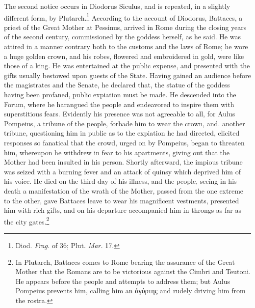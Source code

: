 \documentclass[a4paper, 11pt, oneside, polutonikogreek, english]{article}
\begin{document}
The second notice occurs in Diodorus Siculus, and is repeated, in a slightly different form, by Plutarch.\footnote{Diod. \emph{Frag.} of 36; Plut. \emph{Mar.} 17.} According to the account of Diodorus, Battaces, a priest of the Great Mother at Pessinus, arrived in Rome during the closing years of the second century, commissioned by the goddess herself, as he said. He was attired in a manner contrary both to the customs and the laws of Rome; he wore a huge golden crown, and his robes, flowered and embroidered in gold, were like those of a king. He was entertained at the public expense, and presented with the gifts usually bestowed upon guests of the State. Having gained an audience before the magistrates and the Senate, he declared that, the statue of the goddess having been profaned, public expiation must be made. He descended into the Forum, where he harangued the people and endeavored to inspire them with superstitious fears. Evidently his presence was not agreeable to all, for Aulus Pompeius, a tribune of the people, forbade him to wear the crown, and. another tribune, questioning him in public as to the expiation he had directed, elicited responses so fanatical that the crowd, urged on by Pompeius, began to threaten him, whereupon he withdrew in fear to his apartments, giving out that the Mother had been insulted in his person. Shortly afterward, the impious tribune was seized with a burning fever and an attack of quinsy which deprived him of his voice. He died on the third day of his illness, and the people, seeing in his death a manifestation of the wrath of the Mother, passed from the one extreme to the other, gave Battaces leave to wear his magnificent vestments, presented him with rich gifts, and on his departure accompanied him in throngs as far as the city gates.\footnote{In Plutarch, Battaces comes to Rome bearing the assurance of the Great Mother that the Romans are to be victorious against the Cimbri and Teutoni. He appears before the people and attempts to address them; but Aulus Pompeius prevents him, calling him an ἀγύρτης and rudely driving him from the rostra.}
\end{document}
